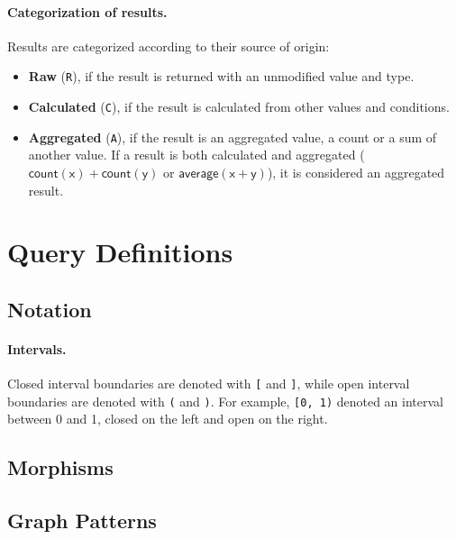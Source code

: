 \paragraph{Categorization of results.} Results are categorized according to their source of origin:

\begin{itemize}
	\item \textbf{Raw} (\texttt{R}), if the result is returned with an unmodified value and type.
	\item \textbf{Calculated} (\texttt{C}), if the result is calculated from other values and conditions.
	\item \textbf{Aggregated} (\texttt{A}), if the result is an aggregated value, \eg a count or a sum of another value. If a result is both calculated and aggregated (\eg $\mathsf{count(x) + count(y)}$ or $\mathsf{average(x + y)}$), it is considered an aggregated result.
\end{itemize}



\section{Query Definitions}

\subsection{Notation}

\paragraph{Intervals.} Closed interval boundaries are denoted with \texttt{[} and \texttt{]}, while open interval boundaries are denoted with \texttt{(} and \texttt{)}. For example, \texttt{[0, 1)} denoted an interval between 0 and 1, closed on the left and open on the right.

\subsection{Morphisms}


\subsection{Graph Patterns}

